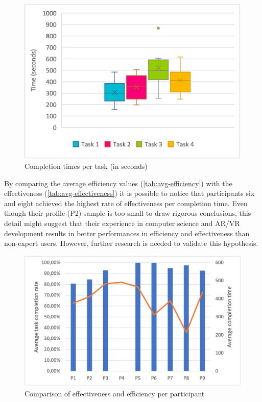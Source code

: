 \begin{figure}[htbp]
    \centering
    \includegraphics[width=0.8\linewidth]{Figures/Evaluation/results/completion-times.png}
    \caption{Completion times per task (in seconds)}
    \label{fig:completion-times}
\end{figure}
By comparing the average efficiency values (\autoref{tab:avg-efficiency}) with the effectiveness (\autoref{tab:avg-effectiveness}) it is possible to notice that participants six and eight achieved the highest rate of effectiveness per completion time. Even though their profile (P2) sample is too small to draw rigorous conclusions, this detail might suggest that their experience in computer science and AR/VR development results in better performances in efficiency and effectiveness than non-expert users. However, further research is needed to validate this hypothesis.
\begin{figure}[htbp]
    \centering
    \includegraphics{Figures/Evaluation/results/completion-rate-time.png}
    \caption{Comparison of effectiveness and efficiency per participant}
    \label{fig:completion-rate-times}
\end{figure}


